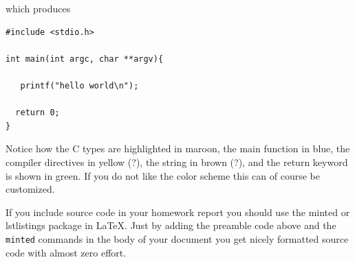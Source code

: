 which produces

\begin{verbatim}
#include <stdio.h>

int main(int argc, char **argv){

   printf("hello world\n");

  return 0;
}
\end{verbatim}
Notice how the C types are highlighted in maroon, the main function in blue, the compiler directives in yellow (?), the string in brown (?), and the return keyword is shown in green. If you do not like the color scheme this can of course be customized.

If you include source code in your homework report you should use the minted or lstlistings package in \LaTeX{}. Just by adding the preamble code above and the \texttt{minted} commands in the body of your document you get nicely formatted source code with almost zero effort.

\printbibliography[heading=subbibliography]